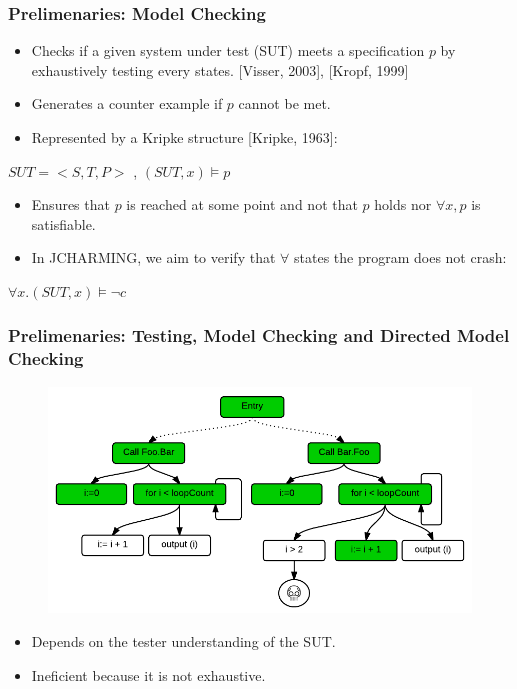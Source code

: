 \documentclass{beamer}
\begin{document}
\begin{frame}
\frametitle{Prelimenaries: Model Checking}

\begin{itemize}

\item Checks if a given system under test (SUT) meets a specification $p$ by exhaustively testing every states. [Visser, 2003], [Kropf, 1999]

\item Generates a counter example if $p$ cannot be met.

\item Represented by a Kripke structure [Kripke, 1963]:
\end{itemize}

\begin{center}
$SUT = < S, T, P >$ ,  $(SUT, x) \models p$
\end{center}

\begin{itemize}

\item Ensures that $p$ is reached at some point and not that $p$ holds nor $\forall x, p$ is satisfiable.
\item In JCHARMING, we aim to verify that $\forall$ states the program does not crash:

\end{itemize}

\begin{center}
$\forall x.(SUT, x) \models \neg c$
\end{center}


\end{frame}


\begin{frame}
\frametitle{Prelimenaries: \textbf{Testing}, Model Checking and Directed Model Checking}

\begin{figure}
\includegraphics[width=0.75\linewidth]{media/test.png}
\end{figure}
\begin{itemize}
\item Depends on the tester understanding of the SUT.
\item Ineficient because it is not exhaustive.
\end{itemize}

\end{frame}
\end{document}
